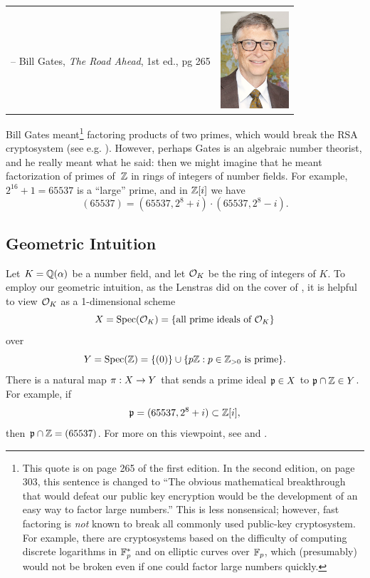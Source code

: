 \begin{tabular}{lr}
{\begin{minipage}{4in}
``The obvious mathematical breakthrough would be development of an easy
way to factor large prime numbers.''
\mbox{ }\\\mbox{}\hspace{3em}-- {Bill Gates, {\em The Road Ahead}, 1st ed., pg 265}
\end{minipage}}
&
\begin{minipage}{2in}
\mbox{}\vspace{3ex}
\includegraphics[width=1in]{Bill_Gates_June_2015}
\end{minipage}
\\
\end{tabular}

Bill Gates meant\footnote{This quote is on page 265 of the first
  edition.  In the second edition, on page 303, this sentence is
  changed to ``The obvious mathematical breakthrough that would defeat
  our public key encryption would be the development of an easy way to
  factor large numbers.''  This is less nonsensical; however, fast
  factoring is {\em not} known to break all commonly used public-key
  cryptosystem.  For example, there are cryptosystems based on the
  difficulty of computing discrete logarithms in $\mathbb{F}_p^*$ and on
  elliptic curves over $\mathbb{F}_p$, which (presumably) would not be broken
  even if one could factor large numbers quickly.}  factoring products
of two primes, which would break the RSA cryptosystem (see
e.g. \cite[\S3.2]{stein:ent}).  However, perhaps Gates is an
algebraic number theorist, and he really meant what he said: then we
might imagine that he meant factorization of primes of~$\mathbb{Z}$ in rings
of integers of number fields.  For example, $2^{16}+1 = 65537$ is a
``large'' prime, and in $\mathbb{Z}[i]$ we have
$$ (65537) = (65537, 2^8 + i) \cdot (65537, 2^8 - i).$$

\subsection{Geometric Intuition}\label{sec:geom_intuition}
Let $K=\mathbb{Q}(\alpha)$ be a number field, and let $\mathcal{O}_K$ be the ring of
integers of $K$.  To employ our geometric intuition, as the Lenstras
did on the cover of \cite{lenstras:nfs}, it is helpful to
view $\mathcal{O}_K$ as a 1-dimensional scheme
$$
  X = \operatorname{Spec}(\mathcal{O}_K) = \{\text{all prime ideals of $\mathcal{O}_K$}\}
$$
over
$$
  Y=\operatorname{Spec}(\mathbb{Z}) = \{ (0) \} \cup \{ p\mathbb{Z} : p \in\mathbb{Z}_{>0} \text{ is prime}\}.
$$
There is a natural map $\pi :X\rightarrow Y$ that sends a prime ideal $\mathfrak{p}\in X$ to
$\mathfrak{p}\cap \mathbb{Z}\in Y$.
For example, if
$$
 \mathfrak{p} = (65537, 2^8 + i)\subset\mathbb{Z}[i],
$$
then
$\mathfrak{p} \cap \mathbb{Z} = (65537)$.
For more on this viewpoint,
see \cite{hartshorne} and \cite[Ch.~2]{eisenbud_harris:geometry}.

